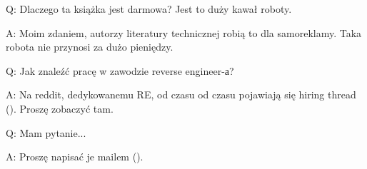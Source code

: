 \par Q: Dlaczego ta książka jest darmowa? Jest to duży kawał roboty.
\par A: Moim zdaniem, autorzy literatury technicznej robią to dla samoreklamy. Taka robota nie przynosi za dużo pieniędzy.

\par Q: Jak znaleźć pracę w zawodzie reverse engineer-а?
\par A: Na reddit, dedykowanemu RE\FNURLREDDIT, od czasu od czasu pojawiają się hiring thread (\RedditHiringThread{}).
Proszę zobaczyć tam.

\par Q: Mam pytanie...
\par A: Proszę napisać je mailem (\EMAIL).


